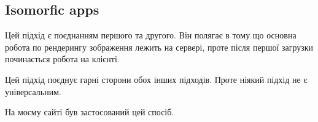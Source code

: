 \subsection{Isomorfic apps}
Цей підхід є поєднанням першого та другого.
Він полягає в тому що основна робота по рендерингу зображення лежить на сервері,
проте після першої загрузки починається робота на клієнті.

Цей підхід поєднує гарні сторони обох інших підходів. Проте ніякий підхід не є універсальним.

На моєму сайті був застосований цей спосіб.
